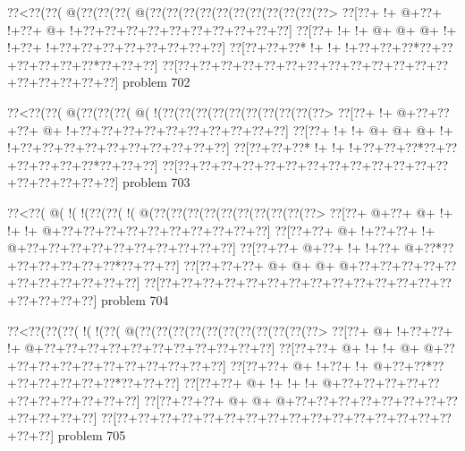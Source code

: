 \vbox{\vbox{\goo
\0??<\0??(\0??(\- @(\0??(\0??(\0??(\- @(\0??(\0??(\0??(\0??(\0??(\0??(\0??(\0??(\0??(\0??(\0??>
\0??[\0??+\- !+\- @+\0??+\- !+\0??+\- @+\- !+\0??+\0??+\0??+\0??+\0??+\0??+\0??+\0??+\0??+\0??]
\0??[\0??+\- !+\- !+\- @+\- @+\- @+\- !+\- !+\0??+\- !+\0??+\0??+\0??+\0??+\0??+\0??+\0??+\0??]
\0??[\0??+\0??+\0??*\- !+\- !+\- !+\0??+\0??+\0??*\0??+\0??+\0??+\0??+\0??+\0??*\0??+\0??+\0??]
\0??[\0??+\0??+\0??+\0??+\0??+\0??+\0??+\0??+\0??+\0??+\0??+\0??+\0??+\0??+\0??+\0??+\0??+\0??]
}
\hfil problem 702\hfil\break
}



\vbox{\vbox{\goo
\0??<\0??(\0??(\- @(\0??(\0??(\0??(\- @(\- !(\0??(\0??(\0??(\0??(\0??(\0??(\0??(\0??(\0??(\0??>
\0??[\0??+\- !+\- @+\0??+\0??+\0??+\- @+\- !+\0??+\0??+\0??+\0??+\0??+\0??+\0??+\0??+\0??+\0??]
\0??[\0??+\- !+\- !+\- @+\- @+\- @+\- !+\- !+\0??+\0??+\0??+\0??+\0??+\0??+\0??+\0??+\0??+\0??]
\0??[\0??+\0??+\0??*\- !+\- !+\- !+\0??+\0??+\0??*\0??+\0??+\0??+\0??+\0??+\0??*\0??+\0??+\0??]
\0??[\0??+\0??+\0??+\0??+\0??+\0??+\0??+\0??+\0??+\0??+\0??+\0??+\0??+\0??+\0??+\0??+\0??+\0??]
}
\hfil problem 703\hfil\break
}



\vbox{\vbox{\goo
\0??<\0??(\- @(\- !(\- !(\0??(\0??(\- !(\- @(\0??(\0??(\0??(\0??(\0??(\0??(\0??(\0??(\0??(\0??>
\0??[\0??+\- @+\0??+\- @+\- !+\- !+\- !+\- @+\0??+\0??+\0??+\0??+\0??+\0??+\0??+\0??+\0??+\0??]
\0??[\0??+\0??+\- @+\- !+\0??+\0??+\- !+\- @+\0??+\0??+\0??+\0??+\0??+\0??+\0??+\0??+\0??+\0??]
\0??[\0??+\0??+\- @+\0??+\- !+\- !+\0??+\- @+\0??*\0??+\0??+\0??+\0??+\0??+\0??*\0??+\0??+\0??]
\0??[\0??+\0??+\0??+\- @+\- @+\- @+\- @+\0??+\0??+\0??+\0??+\0??+\0??+\0??+\0??+\0??+\0??+\0??]
\0??[\0??+\0??+\0??+\0??+\0??+\0??+\0??+\0??+\0??+\0??+\0??+\0??+\0??+\0??+\0??+\0??+\0??+\0??]
}
\hfil problem 704\hfil\break
}



\vbox{\vbox{\goo
\0??<\0??(\0??(\0??(\- !(\- !(\0??(\- @(\0??(\0??(\0??(\0??(\0??(\0??(\0??(\0??(\0??(\0??(\0??>
\0??[\0??+\- @+\- !+\0??+\0??+\- !+\- @+\0??+\0??+\0??+\0??+\0??+\0??+\0??+\0??+\0??+\0??+\0??]
\0??[\0??+\0??+\- @+\- !+\- !+\- @+\- @+\0??+\0??+\0??+\0??+\0??+\0??+\0??+\0??+\0??+\0??+\0??]
\0??[\0??+\0??+\- @+\- !+\0??+\- !+\- @+\0??+\0??*\0??+\0??+\0??+\0??+\0??+\0??*\0??+\0??+\0??]
\0??[\0??+\0??+\- @+\- !+\- !+\- !+\- @+\0??+\0??+\0??+\0??+\0??+\0??+\0??+\0??+\0??+\0??+\0??]
\0??[\0??+\0??+\0??+\- @+\- @+\- @+\0??+\0??+\0??+\0??+\0??+\0??+\0??+\0??+\0??+\0??+\0??+\0??]
\0??[\0??+\0??+\0??+\0??+\0??+\0??+\0??+\0??+\0??+\0??+\0??+\0??+\0??+\0??+\0??+\0??+\0??+\0??]
}
\hfil problem 705\hfil\break
}



